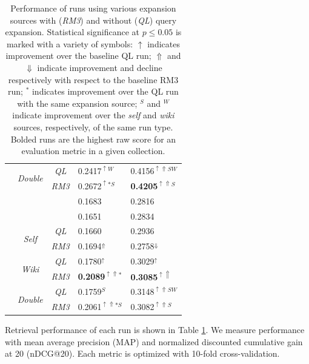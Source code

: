 \documentclass{sig-alternate}
\begin{document}
\begin{table}
\begin{tabular}{|c|c|c|l|l|}
\rule{0pt}{2.5ex} & \multirow{2}{*}{\it Double} & {\it QL} & 0.2417$^{\uparrow W}$ & 0.4156$^{\uparrow\Uparrow SW}$ \\ \cline{3-5}
\rule{0pt}{2.5ex} & & {\it RM3} & 0.2672$^{\uparrow *S}$ & \textbf{0.4205}$^{\uparrow\Uparrow S}$ \\ \hline\hline
\rule{0pt}{2.5ex} \multirow{8}{*}{wt10g} & \cellcolor{gray!50} & \cellcolor{gray!50}{\it QL} & \cellcolor{gray!50}0.1683 & \cellcolor{gray!50}0.2816 \\ \cline{3-5}
\rule{0pt}{2.5ex} & \cellcolor{gray!50} \multirow{-2}{*}{\it Baseline} & \cellcolor{gray!50}{\it RM3} & \cellcolor{gray!50}0.1651 & \cellcolor{gray!50}0.2834 \\ \cline{2-5}
\rule{0pt}{2.5ex} & \multirow{2}{*}{\it Self} & {\it QL} & 0.1660 & 0.2936 \\ \cline{3-5}
\rule{0pt}{2.5ex} & & {\it RM3} & 0.1694$^\Uparrow$ & 0.2758$^\Downarrow$ \\ \cline{2-5}
\rule{0pt}{2.5ex} & \multirow{2}{*}{\it Wiki} & {\it QL} & 0.1780$^\uparrow$ & 0.3029$^\uparrow$ \\ \cline{3-5}
\rule{0pt}{2.5ex} & & {\it RM3} & \textbf{0.2089}$^{\uparrow\Uparrow *}$ & \textbf{0.3085}$^{\uparrow\Uparrow}$ \\ \cline{2-5}
\rule{0pt}{2.5ex} & \multirow{2}{*}{\it Double} & {\it QL} & 0.1759$^{S}$ & 0.3148$^{\uparrow\Uparrow SW}$ \\ \cline{3-5}
\rule{0pt}{2.5ex} & & {\it RM3} & 0.2061$^{\uparrow\Uparrow *S}$ & 0.3082$^{\uparrow\Uparrow S}$ \\ \hline
\end{tabular}
\caption{Performance of runs using various expansion sources with (\textit{RM3}) and without (\textit{QL}) query expansion. Statistical significance at $p \leq 0.05$ is marked with a variety of symbols: $\uparrow$ indicates improvement over the baseline QL run; $\Uparrow$ and $\Downarrow$ indicate improvement and decline respectively with respect to the baseline RM3 run; $^{*}$ indicates improvement over the QL run with the same expansion source; $^{S}$ and $^{W}$ indicate improvement over the \textit{self} and \textit{wiki} sources, respectively, of the same run type. Bolded runs are the highest raw score for an evaluation metric in a given collection.}
\label{table.performance}
\end{table}

Retrieval performance of each run is shown in Table \ref{table.performance}. We measure performance with mean average precision (MAP) and normalized discounted cumulative gain at 20 (nDCG@20). Each metric is optimized with 10-fold cross-validation.
\end{document}
